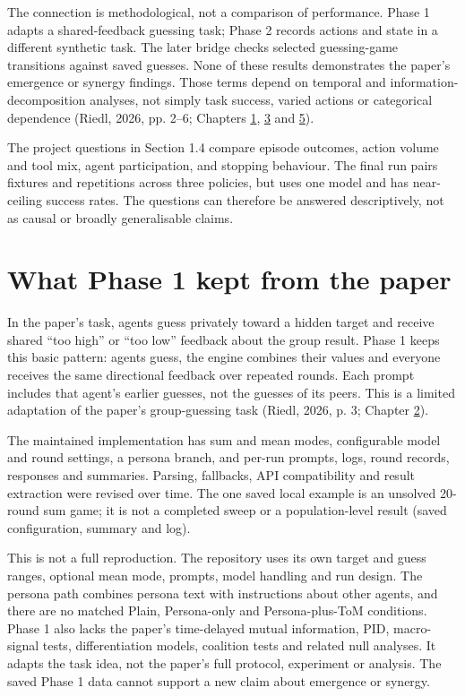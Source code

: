 \documentclass[12pt,a4paper,oneside]{report}
\begin{document}
The connection is methodological, not a comparison of performance. Phase 1 adapts a shared-feedback guessing task; Phase 2 records actions and state in a different synthetic task. The later bridge checks selected guessing-game transitions against saved guesses. None of these results demonstrates the paper’s emergence or synergy findings. Those terms depend on temporal and information-decomposition analyses, not simply task success, varied actions or categorical dependence (Riedl, 2026, pp. 2–6; Chapters \hyperref[chapter-01]{1}, \hyperref[chapter-03]{3} and \hyperref[chapter-05]{5}).

The project questions in Section 1.4 compare episode outcomes, action volume and tool mix, agent participation, and stopping behaviour. The final run pairs fixtures and repetitions across three policies, but uses one model and has near-ceiling success rates. The questions can therefore be answered descriptively, not as causal or broadly generalisable claims.

\section{What Phase 1 kept from the paper}
In the paper’s task, agents guess privately toward a hidden target and receive shared “too high” or “too low” feedback about the group result. Phase 1 keeps this basic pattern: agents guess, the engine combines their values and everyone receives the same directional feedback over repeated rounds. Each prompt includes that agent’s earlier guesses, not the guesses of its peers. This is a limited adaptation of the paper’s group-guessing task (Riedl, 2026, p. 3; Chapter \hyperref[chapter-02]{2}).

The maintained implementation has sum and mean modes, configurable model and round settings, a persona branch, and per-run prompts, logs, round records, responses and summaries. Parsing, fallbacks, API compatibility and result extraction were revised over time. The one saved local example is an unsolved 20-round sum game; it is not a completed sweep or a population-level result (saved configuration, summary and log).

This is not a full reproduction. The repository uses its own target and guess ranges, optional mean mode, prompts, model handling and run design. The persona path combines persona text with instructions about other agents, and there are no matched Plain, Persona-only and Persona-plus-ToM conditions. Phase 1 also lacks the paper’s time-delayed mutual information, PID, macro-signal tests, differentiation models, coalition tests and related null analyses. It adapts the task idea, not the paper’s full protocol, experiment or analysis. The saved Phase 1 data cannot support a new claim about emergence or synergy.
\end{document}
